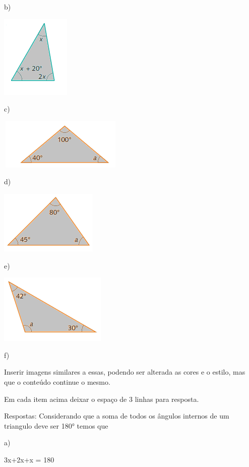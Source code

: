 b)

\includegraphics[width=1.30208in,height=1.5625in]{./imgSAEB_8_MAT/media/image26.png}

c)

\includegraphics[width=2.33333in,height=0.95833in]{./imgSAEB_8_MAT/media/image27.png}

d)

\includegraphics[width=1.83333in,height=1.1875in]{./imgSAEB_8_MAT/media/image28.png}

e)

\includegraphics[width=2in,height=1.30208in]{./imgSAEB_8_MAT/media/image29.png}

f)

Inserir imagens similares a essas, podendo ser alterada as cores e o
estilo, mas que o conteúdo continue o mesmo.

Em cada item acima deixar o espaço de 3 linhas para resposta.

Respostas: Considerando que a soma de todos os ângulos internos de um
triangulo deve ser 180° temos que

a)

3x+2x+x = 180

